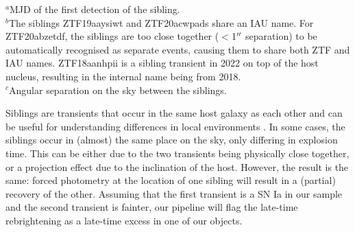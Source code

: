 \documentclass[a4paper,oneside,12pt, class=Latex/Classes/PhDthesisPSnPDF, crop=false]{standalone}
\begin{document}
\begin{table}
 \centering
 \caption{Objects with a detected sibling transient.}
 \begin{flushleft}
$^a$MJD of the first detection of the sibling. \\
$^b$The siblings ZTF19aaysiwt and ZTF20acwpads share an IAU name. For ZTF20abzetdf, the siblings are too close together ($<$1$^{\prime\prime}$ separation) to be automatically recognised as separate events, causing them to share both ZTF and IAU names. ZTF18aanhpii is a sibling transient in 2022 on top of the host nucleus, resulting in the internal name being from 2018. \\
$^c$Angular separation on the sky between the siblings. \\
\end{flushleft} 
 \label{siblings}
\end{table}


Siblings are transients that occur in the same host galaxy as each other and can be useful for understanding differences in local environments \citep[e.g.][]{biswas_siblings, ZTF_siblings}. In some cases, the siblings occur in (almost) the same place on the sky, only differing in explosion time. This can be either due to the two transients being physically close together, or a projection effect due to the inclination of the host. However, the result is the same: forced photometry at the location of one sibling will result in a (partial) recovery of the other. Assuming that the first transient is a SN Ia in our sample and the second transient is fainter, our pipeline will flag the late-time rebrightening as a late-time excess in one of our objects.
\end{document}
